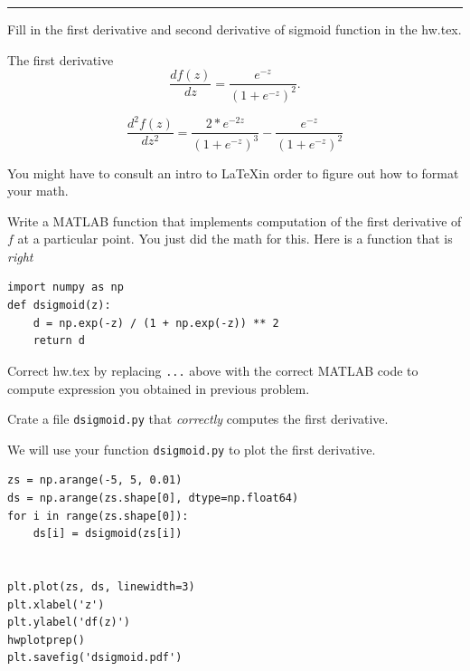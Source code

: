 \documentclass{article}
\begin{document}
\hrule

\newproblem{1pt}
Fill in the first derivative and second derivative of sigmoid function in the hw\theHW.tex.

The first derivative
\[
\frac{d f(z)}{dz} =  \frac{e^{-z}}{(1 + e^{-z})^2}.%
\]

\[
\frac{d^2 f(z)}{dz^2} = \frac{2 * e^{-2z}}{(1 + e^{-z})^3} - \frac{e^{-z}}{(1 + e^{-z})^2}
\]

You might have to consult an intro to \LaTeX in order to figure out how to format your math.

\newproblem{1pt}
Write a MATLAB function that implements computation  of the first derivative of $f$ at a particular point. You just did the math for this.
Here is a function that is {\em right}
\begin{lstlisting}
import numpy as np
def dsigmoid(z):
    d = np.exp(-z) / (1 + np.exp(-z)) ** 2
    return d
\end{lstlisting}
Correct hw\theHW.tex by replacing {\tt ...} above with the correct MATLAB code to compute expression you obtained in previous problem.

Crate a file {\tt dsigmoid.py} that {\em correctly} computes the first derivative.

\newproblem{1pt}

We will use your function {\tt dsigmoid.py} to plot the first derivative.
\begin{lstlisting}
zs = np.arange(-5, 5, 0.01)
ds = np.arange(zs.shape[0], dtype=np.float64)
for i in range(zs.shape[0]):
    ds[i] = dsigmoid(zs[i])


plt.plot(zs, ds, linewidth=3)
plt.xlabel('z')
plt.ylabel('df(z)')
hwplotprep()
plt.savefig('dsigmoid.pdf')
\end{lstlisting}
\end{document}
